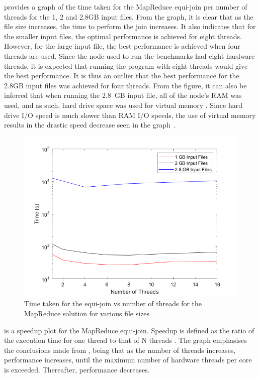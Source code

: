 \documentclass[12pt,twocolumn]{witseiepaper}
\begin{document}
 provides a graph of the time taken for the MapReduce equi-join per number of threads for the 1, 2 and 2.8GB input files. From the graph, it is clear that as the file size increases, the time to perform the join increases. It also indicates that for the smaller input files, the optimal performance is achieved for eight threads. However, for the large input file, the best performance is achieved when four threads are used. Since the node used to run the benchmarks had eight hardware threads, it is expected that running the program with eight threads would give the best performance. It is thus an outlier that the best performance for the 2.8GB input files was achieved for four threads. From the figure, it can also be inferred that when running the 2.8~GB input file, all of the node's RAM was used, and as such, hard drive space was used for virtual memory \cite{ram}. Since hard drive I/O speed is much slower than RAM I/O speeds, the use of virtual memory results in the drastic speed decrease seen in the graph~\cite{ram}.

\begin{figure}[h]
	\centering
	\includegraphics[width=1\columnwidth]{mapReduceTimevsThreads.png}
	\caption{Time taken for the equi-join vs number of threads for the MapReduce solution for various file sizes}
	\raggedright
	\label{fig:resultsMR}	
\end{figure}

 is a speedup plot for the MapReduce equi-join. Speedup is defined as the ratio of the execution time for one thread to that of N threads \cite{speedup}. The graph emphasises the conclusions made from , being that as the number of threads increases, performance increases, until the maximum number of hardware threads per core is exceeded. Thereafter, performance decreases.
\end{document}
